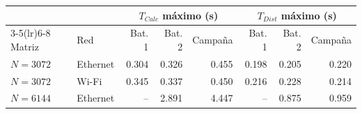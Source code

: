 \begin{center}\small
\begin{tabular}{llrrrrrr}
\toprule
 & & \multicolumn{3}{c}{$T_{Calc}$ máximo (s)} & \multicolumn{3}{c}{$T_{Dist}$ máximo (s)} \\
\cmidrule(lr){3-5}\cmidrule(lr){6-8}
Matriz & Red & Bat. 1 & Bat. 2 & Campaña & Bat. 1 & Bat. 2 & Campaña \\
\midrule
$N=3072$ & Ethernet & 0.304 & 0.326 & 0.455 & 0.198 & 0.205 & 0.220 \\
$N=3072$ & Wi-Fi & 0.345 & 0.337 & 0.450 & 0.216 & 0.228 & 0.214 \\
$N=6144$ & Ethernet & -- & 2.891 & 4.447 & -- & 0.875 & 0.959 \\
\bottomrule
\end{tabular}
\end{center}
